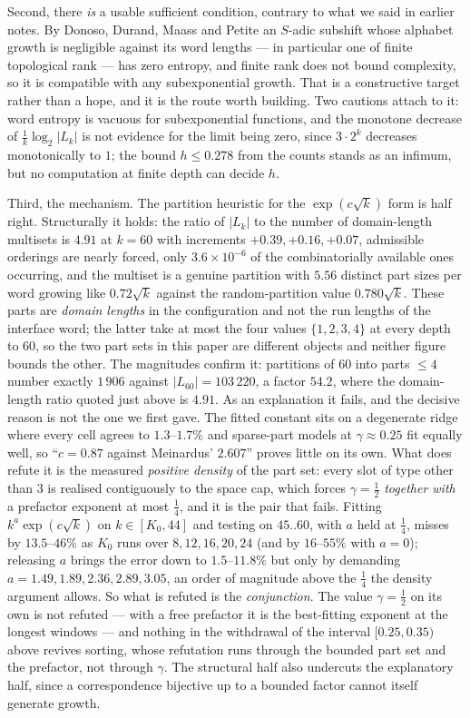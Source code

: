 \documentclass[11pt]{article}
\theoremstyle{definition}
\theoremstyle{remark}
\begin{document}
Second, there \emph{is} a usable sufficient condition, contrary to what we said in earlier notes. By
Donoso, Durand, Maass and Petite \cite[Cor.~6.5]{DDMP} an $S$-adic subshift whose alphabet growth is
negligible against its word lengths --- in particular one of finite topological rank --- has zero
entropy, and finite rank does not bound complexity, so it is compatible with any subexponential
growth. That is a constructive target rather than a hope, and it is the route worth building. Two
cautions attach to it: word entropy is vacuous for subexponential functions, and the monotone decrease
of $\tfrac1k\log_2|L_k|$ is not evidence for the limit being zero, since $3\cdot2^k$ decreases
monotonically to $1$; the bound $h\le0.278$ from the counts stands as an infimum, but no computation at finite depth
can decide $h$.

Third, the mechanism. The partition heuristic for the $\exp(c\sqrt k)$ form is half right. Structurally
it holds: the ratio of $|L_k|$ to the number of domain-length multisets is $4.91$ at $k=60$ with
increments $+0.39,+0.16,+0.07$, admissible orderings are nearly forced, only $3.6\times10^{-6}$ of the
combinatorially available ones occurring, and the multiset is a genuine partition with $5.56$ distinct
part sizes per word growing like $0.72\sqrt k$ against the random-partition value $0.780\sqrt k$. These
parts are \emph{domain lengths} in the configuration and not the run lengths of the interface word; the
latter take at most the four values $\{1,2,3,4\}$ at every depth to $60$, so the two part sets in this
paper are different objects and neither figure bounds the other. The magnitudes confirm it: partitions
of $60$ into parts $\le4$ number exactly $1\,906$ against $|L_{60}|=103\,220$, a factor $54.2$, where the
domain-length ratio quoted just above is $4.91$. As an
explanation it fails, and the decisive reason is not the one we first gave. The fitted constant sits on
a degenerate ridge where every cell agrees to $1.3$--$1.7\%$ and sparse-part models at
$\gamma\approx0.25$ fit equally well, so ``$c=0.87$ against Meinardus' $2.607$'' proves little on its
own. What does refute it is the measured \emph{positive density} of the part set: every slot of type
other than $3$ is realised contiguously to the space cap, which forces $\gamma=\tfrac12$ \emph{together
with} a prefactor exponent at most $\tfrac14$, and it is the pair that fails. Fitting $k^{a}\exp(c\sqrt
k)$ on $k\in[K_0,44]$ and testing on $45..60$, with $a$ held at $\tfrac14$, misses by $13.5$--$46\%$ as
$K_0$ runs over $8,12,16,20,24$ (and by $16$--$55\%$ with $a=0$); releasing $a$ brings the error down to
$1.5$--$11.8\%$ but only by demanding $a=1.49,1.89,2.36,2.89,3.05$, an order of magnitude above the
$\tfrac14$ the density argument allows. So what is refuted is the \emph{conjunction}. The value
$\gamma=\tfrac12$ on its own is not refuted --- with a free prefactor it is the best-fitting exponent at
the longest windows --- and nothing in the withdrawal of the interval $[0.25,0.35)$ above revives
sorting, whose refutation runs through the bounded part set and the prefactor, not through $\gamma$. The
structural half also undercuts the explanatory half, since a correspondence bijective up to a bounded
factor cannot itself generate growth.
\end{document}
